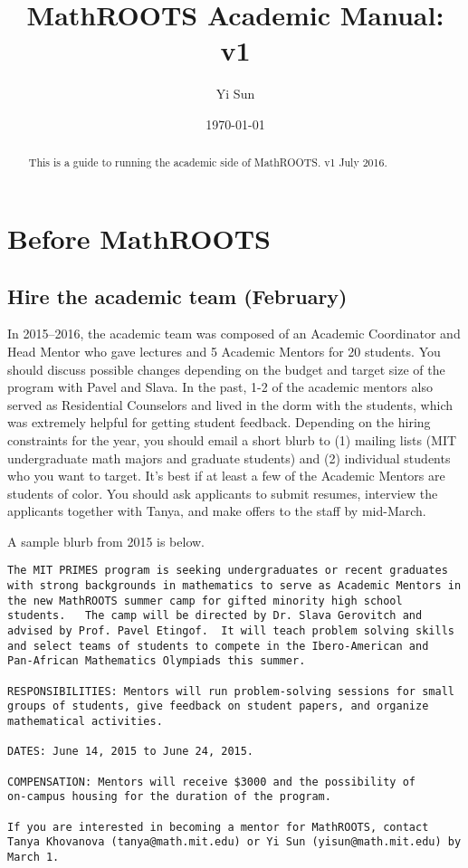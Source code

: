 \documentclass[10pt]{amsart}
\begin{document}
\title{MathROOTS Academic Manual: v1}
\author{Yi Sun}
\date{\today}
\begin{abstract}
This is a guide to running the academic side of MathROOTS.  v1 July 2016.
\end{abstract}
\maketitle

\section{Before MathROOTS}

\subsection{Hire the academic team (February)}

In 2015--2016, the academic team was composed of an Academic Coordinator and Head Mentor who gave lectures and 5 Academic Mentors for 20 students.  You should discuss possible changes depending on the budget and target size of the program with Pavel and Slava.  In the past, 1-2 of the academic mentors also served as Residential Counselors and lived in the dorm with the students, which was extremely helpful for getting student feedback.  Depending on the hiring constraints for the year, you should email a short blurb to (1) mailing lists (MIT undergraduate math majors and graduate students) and (2) individual students who you want to target.  It's best if at least a few of the Academic Mentors are students of color.  You should ask applicants to submit resumes, interview the applicants together with Tanya, and make offers to the staff by mid-March.

A sample blurb from 2015 is below.

\begin{center}
\begin{verbatim}
The MIT PRIMES program is seeking undergraduates or recent graduates
with strong backgrounds in mathematics to serve as Academic Mentors in
the new MathROOTS summer camp for gifted minority high school
students.   The camp will be directed by Dr. Slava Gerovitch and
advised by Prof. Pavel Etingof.  It will teach problem solving skills
and select teams of students to compete in the Ibero-American and
Pan-African Mathematics Olympiads this summer.

RESPONSIBILITIES: Mentors will run problem-solving sessions for small
groups of students, give feedback on student papers, and organize
mathematical activities.

DATES: June 14, 2015 to June 24, 2015.

COMPENSATION: Mentors will receive $3000 and the possibility of
on-campus housing for the duration of the program.

If you are interested in becoming a mentor for MathROOTS, contact
Tanya Khovanova (tanya@math.mit.edu) or Yi Sun (yisun@math.mit.edu) by
March 1.
\end{verbatim}
\end{center}
\end{document}
